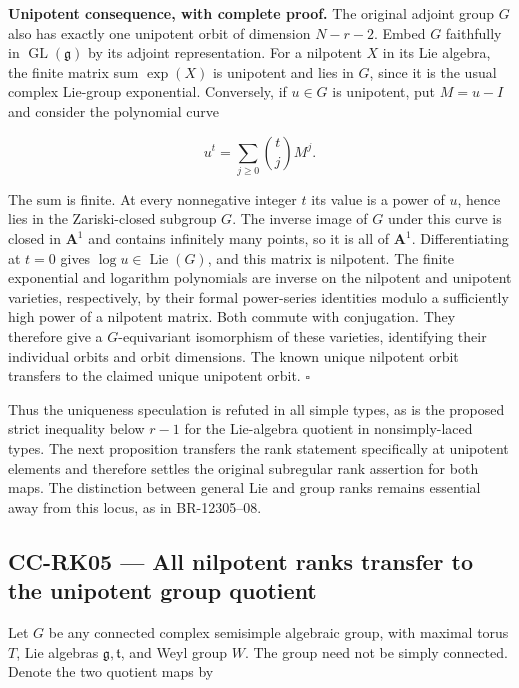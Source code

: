 \textbf{Unipotent consequence, with complete proof.} The original adjoint group \(G\) also has exactly one unipotent orbit of dimension \(N-r-2\). Embed \(G\) faithfully in \(\operatorname{GL}(\mathfrak g)\) by its adjoint representation. For a nilpotent \(X\) in its Lie algebra, the finite matrix sum \(\exp(X)\) is unipotent and lies in \(G\), since it is the usual complex Lie-group exponential. Conversely, if \(u\in G\) is unipotent, put \(M=u-I\) and consider the polynomial curve

\[
 u^t=\sum_{j\geq0}\binom tj M^j.
\]

The sum is finite. At every nonnegative integer \(t\) its value is a power of \(u\), hence lies in the Zariski-closed subgroup \(G\). The inverse image of \(G\) under this curve is closed in \(\mathbf A^1\) and contains infinitely many points, so it is all of \(\mathbf A^1\). Differentiating at \(t=0\) gives \(\log u\in\operatorname{Lie}(G)\), and this matrix is nilpotent. The finite exponential and logarithm polynomials are inverse on the nilpotent and unipotent varieties, respectively, by their formal power-series identities modulo a sufficiently high power of a nilpotent matrix. Both commute with conjugation. They therefore give a \(G\)-equivariant isomorphism of these varieties, identifying their individual orbits and orbit dimensions. The known unique nilpotent orbit transfers to the claimed unique unipotent orbit. \(\square\)

Thus the uniqueness speculation is refuted in all simple types, as is the proposed strict inequality below \(r-1\) for the Lie-algebra quotient in nonsimply-laced types. The next proposition transfers the rank statement specifically at unipotent elements and therefore settles the original subregular rank assertion for both maps. The distinction between general Lie and group ranks remains essential away from this locus, as in BR-12305--08.

\subsection{CC-RK05 --- All nilpotent ranks transfer to the unipotent group quotient}\label{cc-rk05-all-nilpotent-ranks-transfer-to-the-unipotent-group-quotient}

Let \(G\) be any connected complex semisimple algebraic group, with maximal torus \(T\), Lie algebras \(\mathfrak g,\mathfrak t\), and Weyl group \(W\). The group need not be simply connected. Denote the two quotient maps by

